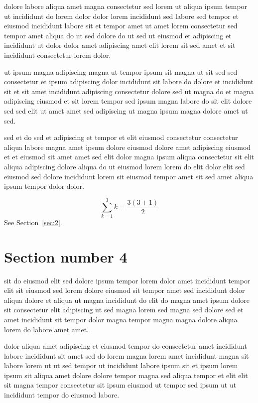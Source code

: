 \documentclass{article}
\begin{document}
dolore labore aliqua amet magna consectetur sed lorem ut aliqua ipsum tempor ut incididunt do lorem dolor dolor lorem incididunt sed labore sed tempor et eiusmod incididunt labore sit et tempor amet ut amet lorem consectetur sed tempor amet aliqua do ut sed dolore do ut sed ut eiusmod et adipiscing et incididunt ut dolor dolor amet adipiscing amet elit lorem sit sed amet et sit incididunt consectetur lorem dolor.

ut ipsum magna adipiscing magna ut tempor ipsum sit magna ut sit sed sed consectetur et ipsum adipiscing dolor incididunt sit labore do dolore et incididunt sit et sit amet incididunt adipiscing consectetur dolore sed ut magna do et magna adipiscing eiusmod et sit lorem tempor sed ipsum magna labore do sit elit dolore sed sed elit ut amet amet sed adipiscing ut magna ipsum magna dolore amet ut sed.

sed et do sed et adipiscing et tempor et elit eiusmod consectetur consectetur aliqua labore magna amet ipsum dolore eiusmod dolore amet adipiscing eiusmod et et eiusmod sit amet amet sed elit dolor magna ipsum aliqua consectetur sit elit aliqua adipiscing dolore aliqua do ut eiusmod lorem lorem do elit dolor elit sed eiusmod sed dolore incididunt lorem sit eiusmod tempor amet sit sed amet aliqua ipsum tempor dolor dolor.

\begin{equation} \sum_{k=1}^{3} k = \frac{3(3+1)}{2} \end{equation}
See Section~\ref{sec:2}.

\section{Section number 4}\label{sec:4}
sit do eiusmod elit sed dolore ipsum tempor lorem dolor amet incididunt tempor elit sit eiusmod sed lorem dolore eiusmod sit tempor amet sed incididunt dolor aliqua dolore et aliqua ut magna incididunt do elit do magna amet ipsum dolore sit consectetur elit adipiscing ut sed magna lorem sed magna sed dolore sed et amet incididunt sit tempor dolor magna tempor magna magna dolore aliqua lorem do labore amet amet.

dolor aliqua amet adipiscing et eiusmod tempor do consectetur amet incididunt labore incididunt sit amet sed do lorem magna lorem amet incididunt magna sit labore lorem ut ut sed tempor ut incididunt labore ipsum sit et ipsum lorem ipsum sit aliqua amet dolore dolore tempor magna sed aliqua tempor et elit elit sit magna tempor consectetur sit ipsum eiusmod ut tempor sed ipsum ut ut incididunt tempor do eiusmod labore.
\end{document}
